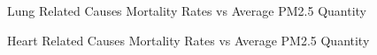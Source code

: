 \documentclass[
  letterpaper,
  DIV=11,
  numbers=noendperiod]{scrartcl}
\begin{document}
\begin{figure}


\caption{\label{fig-lung}Lung Related Causes Mortality Rates vs Average
PM2.5 Quantity}

\end{figure}%

\begin{figure}


\caption{\label{fig-heart}Heart Related Causes Mortality Rates vs
Average PM2.5 Quantity}

\end{figure}%
\end{document}
